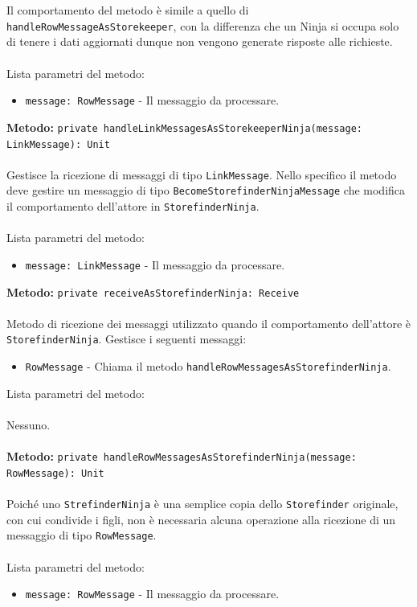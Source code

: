 \documentclass[a4paper]{article}
\begin{document}
			\\ \\
			Il comportamento del metodo è simile a quello di \texttt{handleRowMessageAsStorekeeper}, con la differenza che un Ninja si occupa solo di tenere i dati aggiornati dunque non vengono generate risposte alle richieste.
			\\ \\
			Lista parametri del metodo:
			\begin{itemize}
				\item \texttt{message: RowMessage} - Il messaggio da processare.
			\end{itemize}			
		\textbf{Metodo: }\texttt{private handleLinkMessagesAsStorekeeperNinja(message: LinkMessage): Unit}
			\\ \\
			Gestisce la ricezione di messaggi di tipo \texttt{LinkMessage}. Nello specifico il metodo deve gestire un messaggio di tipo \texttt{BecomeStorefinderNinjaMessage} che modifica il comportamento dell'attore in \texttt{StorefinderNinja}.
			\\ \\
			Lista parametri del metodo:
			\begin{itemize}
				\item \texttt{message: LinkMessage} - Il messaggio da processare.
			\end{itemize}	
		\textbf{Metodo: }\texttt{private receiveAsStorefinderNinja: Receive}
			\\ \\
			Metodo di ricezione dei messaggi utilizzato quando il comportamento dell'attore è \texttt{StorefinderNinja}. Gestisce i seguenti messaggi:
			\begin{itemize}
				\item \texttt{RowMessage} - Chiama il metodo \texttt{handleRowMessagesAsStorefinderNinja}.
			\end{itemize}
			Lista parametri del metodo:
			\\ \\
			Nessuno.
			\\ \\	
		\textbf{Metodo: }\texttt{private handleRowMessagesAsStorefinderNinja(message: RowMessage): Unit}
			\\ \\
			Poiché uno \texttt{StrefinderNinja} è una semplice copia dello \texttt{Storefinder} originale, con cui condivide i figli, non è necessaria alcuna operazione alla ricezione di un messaggio di tipo \texttt{RowMessage}.
			\\ \\
			Lista parametri del metodo:
			\begin{itemize}
				\item \texttt{message: RowMessage} - Il messaggio da processare.
			\end{itemize}
	
\end{document}
